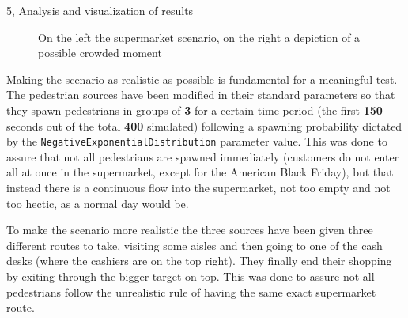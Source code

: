 \documentclass[10pt,a4paper]{article}
\begin{document}
\begin{task}{5, Analysis and visualization of results}
\begin{figure}[H]
    \centering
    \hfill
    \caption{On the left the supermarket scenario, on the right a depiction of a possible crowded moment}
    \label{fig:intro-supermarket}
\end{figure}

Making the scenario as realistic as possible is fundamental for a meaningful test. The pedestrian sources have been modified in their standard parameters so that they spawn pedestrians in groups of \textbf{3} for a certain time period (the first \textbf{150} seconds out of the total \textbf{400} simulated) following a spawning probability dictated by the \texttt{NegativeExponentialDistribution} parameter value. This was done to assure that not all pedestrians are spawned immediately (customers do not enter all at once in the supermarket, except for the American Black Friday), but that instead there is a continuous flow into the supermarket, not too empty and not too hectic, as a normal day would be. 

To make the scenario more realistic the three sources have been given three different routes to take, visiting some aisles and then going to one of the cash desks (where the cashiers are on the top right). They finally end their shopping by exiting through the bigger target on top. This was done to assure not all pedestrians follow the unrealistic rule of having the same exact supermarket route.


\end{task}
\end{document}
